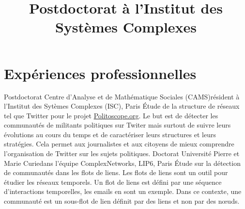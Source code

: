 \documentclass[11pt,a4paper]{moderncv}
\title{Postdoctorat à l'Institut des Systèmes Complexes}
\begin{document}
\maketitle
\vspace{-1.2cm}

\section{Expériences professionnelles}
 {Postdoctorat} {Centre d’Analyse et de Mathématique Sociales (CAMS)}{}{résident à l'Institut des Sytèmes Complexes (ISC), Paris}
{
	Étude de la structure de réseaux tel que Twitter pour le projet \url{Politoscope.org}. Le but est de détecter les communautés de militants politiques sur Twiter mais surtout de suivre leurs évolutions au cours du temps et de caractériser leurs structures et leurs stratégies. Cela permet aux journalistes et aux citoyens de mieux comprendre l'organisation de Twitter sur les sujets politiques.
}
\vspace*{0.2cm}
 {Doctorat} {Université Pierre et Marie Curie}{}{dans l'équipe ComplexNetworks, LIP6, Paris}
{
 Étude sur la détection de communautés dans les flots de liens. Les flots de liens sont un outil pour étudier les réseaux temporels.
 Un flot de liens est défini par une séquence d'interactions temporelles, les emails en sont un exemple. Dans ce contexte, une communauté est un sous-flot de lien définit par des liens et non par des n\oe uds.
}
\vspace*{0.2cm}
%
\vspace*{0.2cm}

\end{document}
